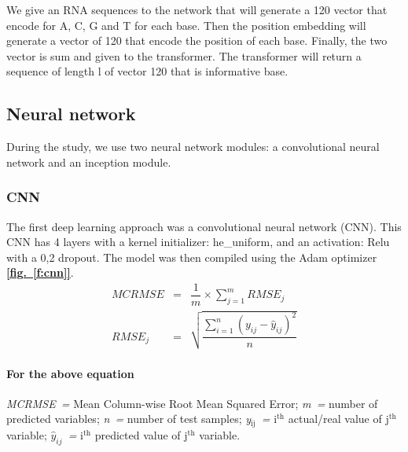 \documentclass[12pt, oneside, a4paper]{report}
\newcommand{\fref}[1]{\hyperref[#1]{\textbf{[fig.~\ref*{#1}]}}}
\newcommand{\p}[1]{$^\text{#1}$}
\newcommand{\id}[1]{$_\text{#1}$}
\newcommand{\ms}{\\[2em]}
\newenvironment{matheq}{
    \begin{equation*}
        \begin{array}{rcl}
}{
        \end{array}
    \end{equation*}
}
\begin{document}
\begin{multicols}{2}
We give an RNA sequences to the network that will generate a 120 vector that encode for A, C, G and T for each base. Then the position embedding will generate a vector of 120 that encode the position of each base. Finally, the two vector is sum and given to the transformer. The transformer will return a sequence of length l of vector 120 that is informative base.

\vspace{-2ex}

\subsection{Neural network}
During the study, we use two neural network modules: a convolutional neural network and an inception module.

\vspace{-2ex}

\subsubsection{CNN}
The first deep learning approach was a convolutional neural network (CNN). This CNN has 4 layers with a kernel initializer: he\_uniform, and an activation: Relu with a 0,2 dropout. The model was then compiled using the Adam optimizer \fref{f:cnn}. 
\begin{matheq}

    MCRMSE & = & \dfrac{1}{m} \times \displaystyle\sum^m_{j = 1} RMSE_j \ms
 
    RMSE_j & = & \sqrt{\dfrac{\displaystyle\sum^n_{i = 1}\left(y_{ij} - \hat{y}_{ij}\right)^2}{n}}
\end{matheq}

\paragraph{For the above equation} \textit{MCRMSE~=} Mean Column-wise Root Mean Squared Error; \textit{m~=} number of predicted variables; \textit{n~=} number of test samples; \textit{y\id{ij}~=} i\p{th} actual/real value of j\p{th} variable; \textit{$\hat{y}_{ij}$~=} i\p{th} predicted value of j\p{th} variable.


\end{multicols}
\end{document}
